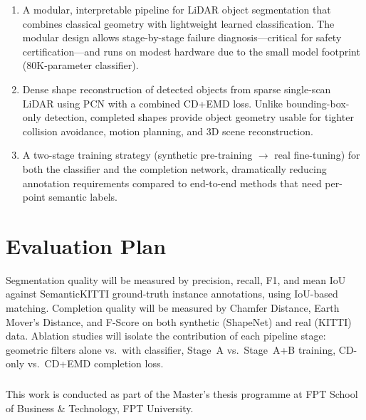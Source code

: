 \documentclass[runningheads]{llncs}
\begin{document}
\begin{enumerate}
    \item A modular, interpretable pipeline for LiDAR object segmentation that combines classical geometry with lightweight learned classification. The modular design allows stage-by-stage failure diagnosis---critical for safety certification---and runs on modest hardware due to the small model footprint (80K-parameter classifier).

    \item Dense shape reconstruction of detected objects from sparse single-scan LiDAR using PCN with a combined CD+EMD loss. Unlike bounding-box-only detection, completed shapes provide object geometry usable for tighter collision avoidance, motion planning, and 3D scene reconstruction.

    \item A two-stage training strategy (synthetic pre-training $\to$ real fine-tuning) for both the classifier and the completion network, dramatically reducing annotation requirements compared to end-to-end methods that need per-point semantic labels.
\end{enumerate}


\section{Evaluation Plan}

Segmentation quality will be measured by precision, recall, F1, and mean IoU against SemanticKITTI ground-truth instance annotations, using IoU-based matching. Completion quality will be measured by Chamfer Distance, Earth Mover's Distance, and F-Score on both synthetic (ShapeNet) and real (KITTI) data. Ablation studies will isolate the contribution of each pipeline stage: geometric filters alone vs.\ with classifier, Stage~A vs.\ Stage~A+B training, CD-only vs.\ CD+EMD completion loss.


\begin{credits}
\subsubsection{\ackname}
This work is conducted as part of the Master's thesis programme at FPT School of Business \& Technology, FPT University.
\end{credits}
\end{document}
